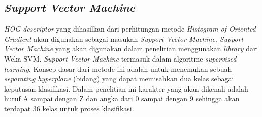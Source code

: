 \subsection{\textit{Support Vector Machine}}
\noindent \textit{HOG descriptor} yang dihasilkan dari perhitungan metode \textit{Histogram of Oriented Gradient} akan digunakan sebagai masukan \textit{Support Vector Machine}. \textit{Support Vector Machine} yang akan digunakan dalam penelitian menggunakan \textit{library} dari Weka SVM. \textit{Support Vector Machine} termasuk dalam algoritme \textit{supervised learning}. Konsep dasar dari metode ini adalah untuk menemukan sebuah \textit{separating hyperplane} (bidang) yang dapat memisahkan dua kelas sebagai keputusan klasifikasi. Dalam penelitian ini karakter yang akan dikenali adalah huruf A sampai dengan Z dan angka dari 0 sampai dengan 9 sehingga akan terdapat 36 kelas untuk proses klasifikasi.



\newpage
